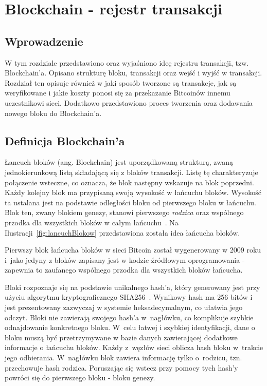 \documentclass[12pt, oneside, final, openany]{mgr}
\begin{document}
\chapter{Blockchain - rejestr transakcji}
\label{blockchain}

\section{Wprowadzenie}
\indent W tym rozdziale przedstawiono oraz wyjaśniono ideę rejestru transakcji, tzw. Blockchain'a. Opisano strukturę bloku, transakcji oraz wejść i wyjść w transakcji. Rozdział ten opisuje również w jaki sposób tworzone są transakcje, jak są weryfikowane i jakie koszty ponosi się za przekazanie Bitcoinów innemu uczestnikowi sieci. Dodatkowo przedstawiono proces tworzenia oraz dodawania nowego bloku do Blockchain'a. 

\section{Definicja Blockchain'a}
\label{definicjaBlockchaina}
\indent Łancuch bloków (ang. Blockchain) jest uporządkowaną strukturą, zwaną jednokierunkową listą składającą się z bloków transakcji. Listę tę charakteryzuje połączenie wsteczne, co oznacza, że blok następny wskazuje na blok poprzedni. Każdy kolejny blok ma przypisaną swoją wysokość w łańcuchu bloków. Wysokość ta ustalana jest na podstawie odległości bloku od pierwszego bloku w łańcuchu. Blok ten, zwany blokiem genezy, stanowi pierwszego \textit{rodzica} oraz wspólnego przodka dla wszystkich bloków w całym łańcuchu~\cite{BitcoinAndCryptocurrencyTechnologies, BlockchainExplained, BitcoinAndTheBlockchain}. Na Ilustracji~\ref{fig:lancuchBlokow} przedstawiona została idea łańcucha bloków.

\indent Pierwszy blok łańcucha bloków w sieci Bitcoin został wygenerowany w 2009 roku i~jako jedyny z bloków zapisany jest w kodzie źródłowym oprogramowania - zapewnia to zaufanego wspólnego przodka dla wszystkich bloków łańcucha.

\indent Bloki rozpoznaje się na podstawie unikalnego hash'a, który generowany jest przy użyciu algorytmu kryptograficznego SHA256~\cite{sha2}. Wynikowy hash ma 256 bitów i jest prezentowany zazwyczaj w systemie heksadecymalnym, co ułatwia jego odczyt. Bloki nie zawierają swojego hash'a w~nagłówku, co komplikuje szybkie odnajdowanie konkretnego bloku. W~celu łatwej i szybkiej identyfikacji, dane o bloku muszą być przetrzymywane w bazie danych zawierającej dodatkowe informacje o łańcuchu bloków. Każdy z~węzłów sieci oblicza hash bloku w~trakcie jego odbierania. W~nagłówku blok zawiera informację tylko o~rodzicu, tzn. przechowuje hash rodzica. Poruszając się wstecz przy pomocy tych hash'y powróci się do pierwszego bloku - bloku genezy. 
\end{document}
